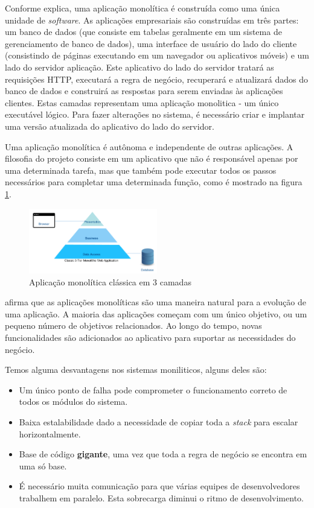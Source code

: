 Conforme  explica, uma aplicação monolítica é construída como uma única unidade de \textit{software}. As aplicações empresariais são construídas em três partes: um banco de dados (que consiste em tabelas geralmente em um sistema de gerenciamento de banco de dados), uma interface de usuário do lado do cliente (consistindo de páginas executando em um navegador ou aplicativos móveis) e um lado do servidor aplicação. Este aplicativo do lado do servidor tratará as requisições HTTP, executará a regra de negócio, recuperará e atualizará dados do banco de dados e construirá as respostas para serem enviadas às aplicações clientes. Estas camadas representam uma aplicação monolitica - um único executável lógico. Para fazer alterações no sistema, é necessário criar e implantar uma versão atualizada do aplicativo do lado do servidor.

Uma aplicação monolítica é autônoma e independente de outras aplicações. A filosofia do projeto consiste em um aplicativo que não é responsável apenas por uma determinada tarefa, mas que também pode executar todos os passos necessários para completar uma determinada função, como é mostrado na figura \ref{fig:three-tier}.

\begin{figure}[ht]
    \centering
    \includegraphics[width=0.5\textwidth]{figuras/three-tier.png}
    \caption{Aplicação monolítica clássica em 3 camadas}
    \label{fig:three-tier}
\end{figure}

 afirma que as aplicações monolíticas são uma maneira natural para a evolução de uma aplicação. A maioria das aplicações começam com um único objetivo, ou um pequeno número de objetivos relacionados. Ao longo do tempo, novas funcionalidades são adicionados ao aplicativo para suportar as necessidades do negócio. 

Temos alguma desvantagens nos sistemas moniliticos, alguns deles são: 

\begin{itemize}
    \item Um único ponto de falha pode comprometer o funcionamento correto de todos os módulos do sistema.
    \item Baixa estalabilidade dado a necessidade de copiar toda a \textit{stack} para escalar horizontalmente.
    \item Base de código \textbf{gigante}, uma vez que toda a regra de negócio se encontra em uma só base.
    \item É necessário muita comunicação para que várias equipes de desenvolvedores trabalhem em paralelo. Esta sobrecarga diminui o ritmo de desenvolvimento.
\end{itemize}

